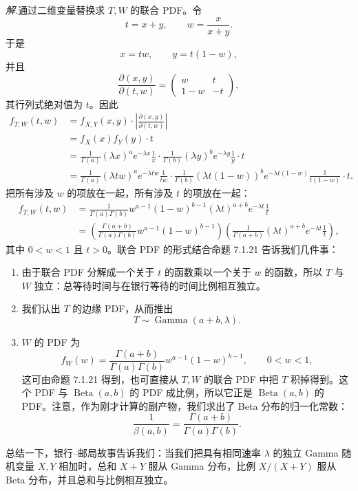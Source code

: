 \documentclass[UTF8, 12pt, fontset=fandol, oneside]{ctexart}
\begin{document}
\noindent\textit{解.}\quad 通过二维变量替换求 $T,W$ 的联合 PDF。令
\[
  t=x+y,\qquad w=\frac{x}{x+y}.
\]
于是
\[
  x=tw,\qquad y=t(1-w),
\]
并且
\[
  \frac{\partial(x,y)}{\partial(t,w)}
  =
  \begin{pmatrix}
    w & t\\
    1-w & -t
  \end{pmatrix},
\]
其行列式绝对值为 $t$。因此
\[
\begin{aligned}
  f_{T,W}(t,w)
  &=f_{X,Y}(x,y)\cdot
    \left|\frac{\partial(x,y)}{\partial(t,w)}\right|\\
  &=f_X(x)f_Y(y)\cdot t\\
  &=\frac{1}{\Gamma(a)}(\lambda x)^a e^{-\lambda x}\frac1x
    \cdot
    \frac{1}{\Gamma(b)}(\lambda y)^b e^{-\lambda y}\frac1y
    \cdot t\\
  &=\frac{1}{\Gamma(a)}(\lambda tw)^a e^{-\lambda tw}\frac1{tw}
    \cdot
    \frac{1}{\Gamma(b)}(\lambda t(1-w))^b e^{-\lambda t(1-w)}
    \frac1{t(1-w)}\cdot t.
\end{aligned}
\]
把所有涉及 $w$ 的项放在一起，所有涉及 $t$ 的项放在一起：
\[
\begin{aligned}
  f_{T,W}(t,w)
  &=
  \frac{1}{\Gamma(a)\Gamma(b)}
  w^{a-1}(1-w)^{b-1}
  (\lambda t)^{a+b}e^{-\lambda t}\frac1t\\
  &=
  \left(\frac{\Gamma(a+b)}{\Gamma(a)\Gamma(b)}
  w^{a-1}(1-w)^{b-1}\right)
  \left(\frac1{\Gamma(a+b)}(\lambda t)^{a+b}e^{-\lambda t}\frac1t\right),
\end{aligned}
\]
其中 $0<w<1$ 且 $t>0$。联合 PDF 的形式结合命题 7.1.21 告诉我们几件事：
\begin{enumerate}
  \item 由于联合 PDF 分解成一个关于 $t$ 的函数乘以一个关于 $w$ 的函数，所以 $T$ 与 $W$ 独立：总等待时间与在银行等待的时间比例相互独立。
  \item 我们认出 $T$ 的边缘 PDF，从而推出
  \[
    T\sim\operatorname{Gamma}(a+b,\lambda).
  \]
  \item $W$ 的 PDF 为
  \[
    f_W(w)=\frac{\Gamma(a+b)}{\Gamma(a)\Gamma(b)}w^{a-1}(1-w)^{b-1},
    \qquad 0<w<1,
  \]
  这可由命题 7.1.21 得到，也可直接从 $T,W$ 的联合 PDF 中把 $T$ 积掉得到。这个 PDF 与 $\operatorname{Beta}(a,b)$ 的 PDF 成比例，所以它正是 $\operatorname{Beta}(a,b)$ 的 PDF。注意，作为刚才计算的副产物，我们求出了 Beta 分布的归一化常数：
  \[
    \frac{1}{\beta(a,b)}=\frac{\Gamma(a+b)}{\Gamma(a)\Gamma(b)}.
  \]
\end{enumerate}

总结一下，银行--邮局故事告诉我们：当我们把具有相同速率 $\lambda$ 的独立 Gamma 随机变量 $X,Y$ 相加时，总和 $X+Y$ 服从 Gamma 分布，比例 $X/(X+Y)$ 服从 Beta 分布，并且总和与比例相互独立。
\end{document}
